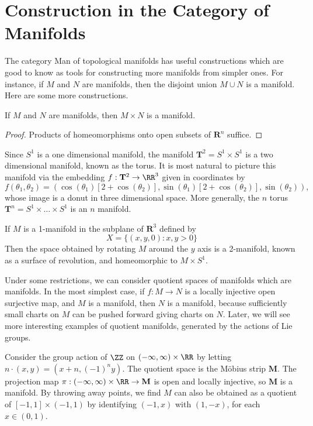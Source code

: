 \section{Construction in the Category of Manifolds}

The category {\sf Man} of topological manifolds has useful constructions which are good to know as tools for constructing more manifolds from simpler ones. For instance, if $M$ and $N$ are manifolds, then the disjoint union $M \cup N$ is a manifold. Here are some more constructions.

\begin{theorem}
    If $M$ and $N$ are manifolds, then $M \times N$ is a manifold.
\end{theorem}
\begin{proof}
    Products of homeomorphisms onto open subsets of $\mathbf{R}^n$ suffice.
\end{proof}

\begin{example}
    Since $S^1$ is a one dimensional manifold, the manifold $\mathbf{T}^2 = S^1 \times S^1$ is a two dimensional manifold, known as the torus. It is most natural to picture this manifold via the embedding $f: \mathbf{T}^2 \to \RR^3$ given in coordinates by
    \[ f(\theta_1,\theta_2) = (\cos(\theta_1) [2 + \cos(\theta_2)],\sin(\theta_1) [2 + \cos(\theta_2)], \sin(\theta_2)), \]
    whose image is a donut in three dimensional space. More generally, the $n$ torus $\mathbf{T}^n = S^1 \times \dots \times S^1$ is an $n$ manifold.
\end{example}

\begin{example}
    If $M$ is a 1-manifold in the subplane of $\mathbf{R}^3$ defined by
    \[ X = \{ (x,y,0): x,y > 0 \} \]
    Then the space obtained by rotating $M$ around the $y$ axis is a 2-manifold, known as a surface of revolution, and homeomorphic to $M \times S^1$.
\end{example}

Under some restrictions, we can consider quotient spaces of manifolds which are manifolds. In the most simplest case, if $f: M \to N$ is a locally injective open surjective map, and $M$ is a manifold, then $N$ is a manifold, because sufficiently small charts on $M$ can be pushed forward giving charts on $N$. Later, we will see more interesting examples of quotient manifolds, generated by the actions of Lie groups.

\begin{example}
    Consider the group action of $\ZZ$ on $(-\infty,\infty) \times \RR$ by letting $n \cdot (x,y) = (x + n, (-1)^n y)$. The quotient space is the M\"{o}bius strip $\mathbf{M}$. The projection map $\pi: (-\infty,\infty) \times \RR \to \mathbf{M}$ is open and locally injective, so $\mathbf{M}$ is a manifold. By throwing away points, we find $M$ can also be obtained as a quotient of $[-1,1] \times (-1,1)$ by identifying $(-1,x)$ with $(1,-x)$, for each $x \in (0,1)$.
\end{example}


